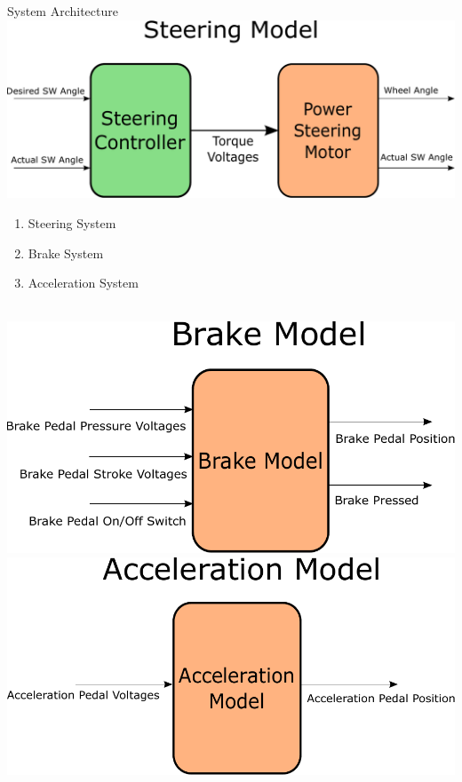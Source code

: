\documentclass{beamer}
\begin{document}
\begin{frame}{System Architecture}
\centering \includegraphics[width=.45\linewidth]{figs/inkscape/steeringModelArchitecture}\quad%
\centering \begin{minipage}[b][0.4\textheight][c]{.45\linewidth} \begin{enumerate} \item Steering System \item Brake System \item Acceleration System \end{enumerate} \end{minipage}\\[1em]
\centering \includegraphics[width=.45\linewidth]{figs/inkscape/brakeModelArchitecture}\quad%
\centering \includegraphics[width=.45\linewidth]{figs/inkscape/accelerationModelArchitecture}
\end{frame}
\end{document}
